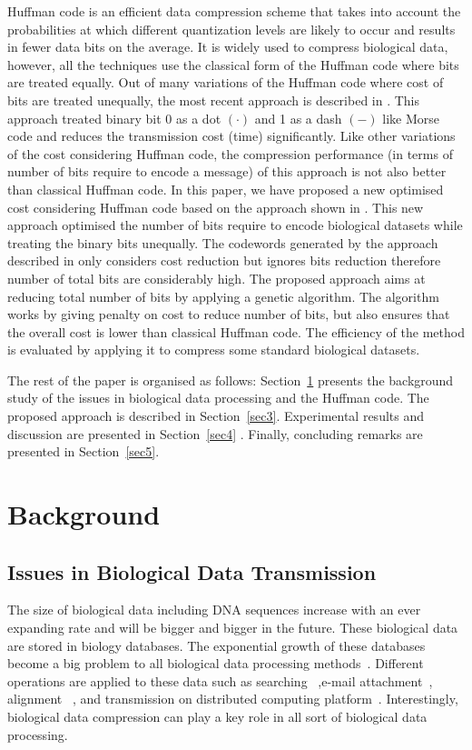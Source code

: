 \documentclass[preprint,12pt]{elsarticle}%
\begin{document}
Huffman code\citep{Huff51} is an efficient data compression scheme that takes into account the probabilities at which different quantization levels are likely to occur and results in fewer data bits on the average. It is widely used to compress biological data, however, all the techniques use the classical form of the Huffman code where bits are treated equally. Out of many variations of the Huffman code where cost of bits are treated unequally, the most recent approach is described in \cite{Kab14}. This approach treated binary bit 0 as a dot $\left(\cdot\right)$ and 1 as a dash $\left(-\right)$ like Morse code and reduces the transmission cost (time) significantly. Like other variations of the cost considering Huffman code, the compression performance (in terms of number of bits require to encode a message) of this approach is not also better than classical Huffman code. In this paper, we have proposed a new optimised cost considering Huffman code based on the approach shown in \cite{Kab14}. This new approach optimised the number of bits require to encode biological datasets while treating the binary bits unequally. The codewords generated by the approach described in\cite{Kab14} only considers cost reduction but ignores bits reduction therefore number of total bits are considerably high. The proposed approach aims at reducing total number of bits   by applying a genetic algorithm. The algorithm works by giving penalty on cost to reduce number of bits, but also ensures that the overall cost is lower than classical Huffman code.  The efficiency of the method is evaluated by applying it to compress some standard biological datasets.         

The rest of the paper is organised as follows: Section~\ref{sec2} presents the background study of the issues in biological data processing and the Huffman code. The proposed approach is described in Section~\ref{sec3}. Experimental results and discussion are presented in Section~\ref{sec4} . Finally, concluding remarks are presented in Section~\ref{sec5}.



\section{Background}
\label{sec2}
\subsection{Issues in Biological Data Transmission}
The size of biological data including DNA sequences increase with an ever expanding rate and will be bigger and bigger in the future. These biological data are stored in biology databases. The exponential growth of these databases become a big problem to all biological data processing methods~\cite{Doug08}.
Different operations are applied to these data such as searching ~\cite{val10},e-mail attachment~\cite{chr09}, alignment ~\cite{che03}, and transmission on distributed computing platform~\cite{cha14}. Interestingly, biological data compression can play a key role in all sort of biological data processing. 
\end{document}
